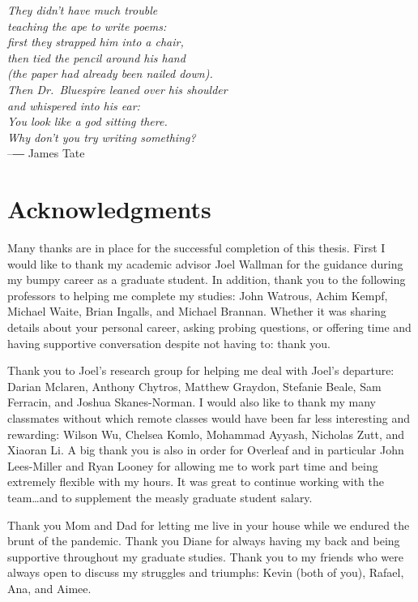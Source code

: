 
\begin{flushright}{\slshape
        They didn't have much trouble \\
        teaching the ape to write poems: \\
        first they strapped him into a chair, \\
        then tied the pencil around his hand \\
        (the paper had already been nailed down). \\
        Then Dr.\ Bluespire leaned over his shoulder \\
        and whispered into his ear: \\
        You look like a god sitting there. \\
        Why don't you try writing something?} \\ \medskip
    --― James Tate
\end{flushright}

\bigskip

\begingroup
\let\clearpage\relax
\let\cleardoublepage\relax
\let\cleardoublepage\relax

\chapter*{Acknowledgments}

Many thanks are in place for the successful completion of this thesis.
First I would like to thank my academic advisor Joel Wallman for the guidance during my bumpy career as a graduate student.
In addition, thank you to the following professors to helping me complete my studies: John Watrous, Achim Kempf, Michael Waite, Brian Ingalls, and Michael Brannan.
Whether it was sharing details about your personal career, asking probing questions, or offering time and having supportive conversation despite not having to: thank you.

Thank you to Joel's research group for helping me deal with Joel's departure: Darian Mclaren, Anthony Chytros, Matthew Graydon, Stefanie Beale, Sam Ferracin, and Joshua Skanes-Norman.
I would also like to thank my many classmates without which remote classes would have been far less interesting and rewarding: Wilson Wu, Chelsea Komlo, Mohammad Ayyash, Nicholas Zutt, and Xiaoran Li.
A big thank you is also in order for Overleaf and in particular John Lees-Miller and Ryan Looney for allowing me to work part time and being extremely flexible with my hours.
It was great to continue working with the team\ldots and to supplement the measly graduate student salary.

Thank you Mom and Dad for letting me live in your house while we endured the brunt of the pandemic.
Thank you Diane for always having my back and being supportive throughout my graduate studies.
Thank you to my friends who were always open to discuss my struggles and triumphs: Kevin (both of you), Rafael, Ana, and Aimee.

\endgroup
